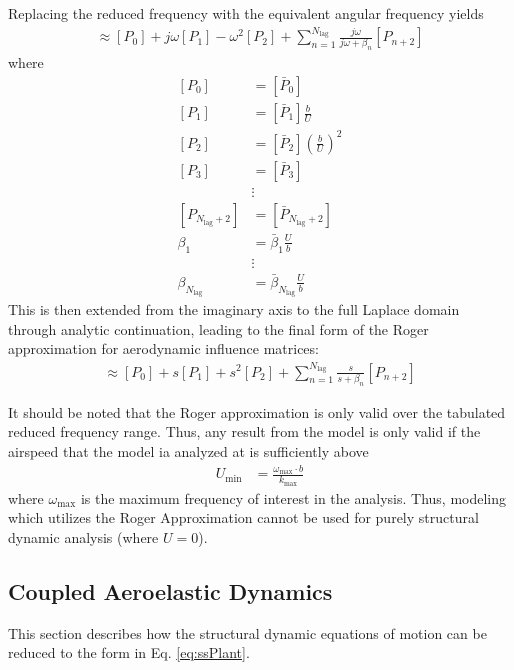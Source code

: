 Replacing the reduced frequency with the equivalent angular frequency yields
\begin{align}
	[A(j\omega)] \approx [P_0] + j\omega [P_1] - \omega^2 [P_2] + \sum_{n=1}^{N_\text{lag}} \frac{j\omega}{j\omega+\beta_n} [P_{n+2}]
\end{align}
where
\begin{equation}
\begin{aligned}
	[P_0] &= [\bar{P}_0] \\
	[P_1] &= [\bar{P}_1] \frac{b}{U} \\
	[P_2] &= [\bar{P}_2] \left(\frac{b}{U}\right)^2 \\
	[P_3] &= [\bar{P}_3] \\
	&\vdots \\
	[P_{N_\text{lag}+2}] &= 	[\bar{P}_{N_\text{lag}+2}] \\
	\beta_1 &= \bar{\beta}_1 \frac{U}{b} \\
	&\vdots \\
	\beta_{N_\text{lag}} &= \bar{\beta}_{N_\text{lag}} \frac{U}{b}
\end{aligned}
\end{equation}
This is then extended from the imaginary axis to the full Laplace domain through analytic continuation, leading to the final form of the Roger approximation for aerodynamic influence matrices:
\begin{align}
	[A(s)] \approx [P_0] + s [P_1] + s^2 [P_2] + \sum_{n=1}^{N_\text{lag}} \frac{s}{s+\beta_n} [P_{n+2}]
\end{align}

It should be noted that the Roger approximation is only valid over the tabulated reduced frequency range. Thus, any result from the model is only valid if the airspeed that the model ia analyzed at is sufficiently above
\begin{align}
	U_\text{min} &= \frac{\omega_\text{max} \cdot b}{k_\text{max}}
\end{align}
where $\omega_\text{max}$ is the maximum frequency of interest in the analysis. Thus, modeling which utilizes the Roger Approximation cannot be used for purely structural dynamic analysis (where $U=0$).

\subsection{Coupled Aeroelastic Dynamics} %

This section describes how the structural dynamic equations of motion can be reduced to the form in Eq. \ref{eq:ssPlant}.

